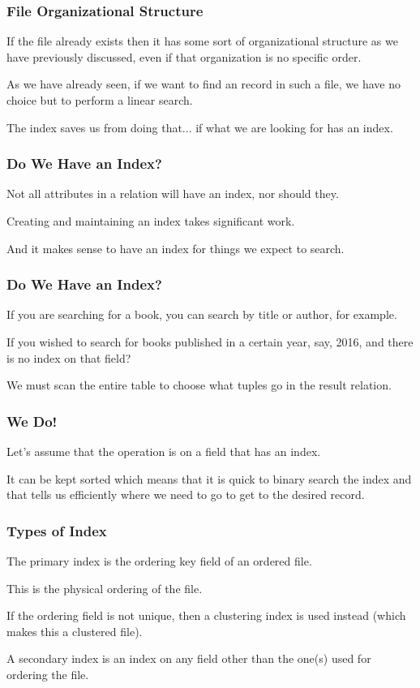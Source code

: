 \begin{frame}
\frametitle{File Organizational Structure}

If the file already exists then it has some sort of organizational structure as we have previously discussed, even if that organization is no specific order. 

As we have already seen, if we want to find an record in such a file, we have no choice but to perform a linear search. 

The index saves us from doing that... if what we are looking for has an index.


\end{frame}

\begin{frame}
\frametitle{Do We Have an Index?}

Not all attributes in a relation will have an index, nor should they. 

Creating and maintaining an index takes significant work. 

And it makes sense to have an index for things we expect to search. 

\end{frame}

\begin{frame}
\frametitle{Do We Have an Index?}

If you are searching for a book, you can search by title or author, for example.

If you wished to search for books published in a certain year, say, 2016, and there is no index on that field?

We must scan the entire table to choose what tuples go in the result relation.
\end{frame}


\begin{frame}
\frametitle{We Do!}

Let's assume that the operation is on a field that has an index.

It can be kept sorted which means that it is quick to binary search the index and that tells us efficiently where we need to go to get to the desired record.

\end{frame}

\begin{frame}
\frametitle{Types of Index}

The \alert{primary index} is the ordering key field of an ordered file. 

This is the physical ordering of the file. 

If the ordering field is not unique, then a \alert{clustering index} is used instead (which makes this a clustered file). 

A \alert{secondary index} is an index on any field other than the one(s) used for ordering the file.

\end{frame}


